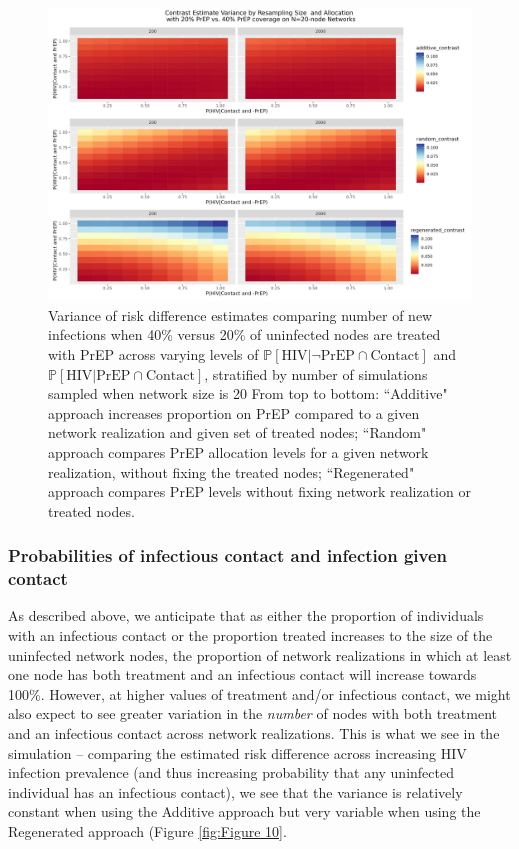 \documentclass{article}
\theoremstyle{definition}
\begin{document}
\begin{figure}[H]
    \centering
    \includegraphics[width=\linewidth]{Corrected Figures/Resampling Size Variance Plot.png}
    \caption{Variance of risk difference estimates comparing number of new infections when 40\% versus 20\% of uninfected nodes are treated with PrEP across varying levels of $\mathbb{P}\left[\text{HIV} \vert \neg \text{PrEP} \cap \text{Contact}\right]$ and $\mathbb{P}\left[\text{HIV} \vert \text{PrEP} \cap \text{Contact}\right]$, stratified by number of simulations sampled when network size is 20 %
    From top to bottom: ``Additive" approach increases proportion on PrEP compared to a given network realization and given set of treated nodes; ``Random" approach compares PrEP allocation levels for a given network realization, without fixing the treated nodes; ``Regenerated" approach compares PrEP levels without fixing network realization or treated nodes. }
    \label{fig:Figure 9}
\end{figure}

\subsubsection{Probabilities of infectious contact and infection given contact}
As described above, we anticipate that as either the proportion of individuals with an infectious contact or the proportion treated increases to the size of the uninfected network nodes, the proportion of network realizations in which at least one node has both treatment and an infectious contact will increase towards 100\%. However, at higher values of treatment and/or infectious contact, we might also expect to see greater variation in the \textit{number} of nodes with both treatment and an infectious contact across network realizations. This is what we see in the simulation -- comparing the estimated risk difference across increasing HIV infection prevalence (and thus increasing probability that any uninfected individual has an infectious contact), we see that the variance is relatively constant when using the Additive approach but very variable when using the Regenerated approach (Figure \ref{fig:Figure 10}.
\end{document}
